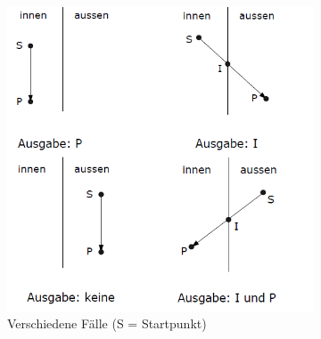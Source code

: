 \begin{figure}[!ht]
	\centering
	\begin{subfigure}[b]{0.5\textwidth}
			\includegraphics[width=\textwidth]{fig/sutherland_hodgman}
			\caption{Verschiedene Fälle (S = Startpunkt)}
	\end{subfigure}
	~
	\begin{subfigure}[b]{0.3\textwidth}

\end{subfigure}
\end{figure}

